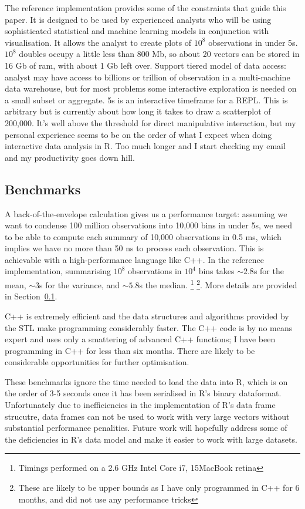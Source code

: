 \documentclass[journal]{vgtc}                %
\begin{document}
The reference implementation provides some of the constraints that guide this paper. It is designed to be used by experienced analysts who will be using  sophisticated statistical and machine learning models in conjunction with visualisation.  It allows the analyst to create plots of $10^8$ observations in under 5s. $10^8$ doubles occupy a little less than 800 Mb, so about 20 vectors can be stored in 16 Gb of ram, with about 1 Gb left over. Support tiered model of data access: analyst may have access to billions or trillion of observation in a multi-machine data warehouse, but for most problems some interactive exploration is needed on a small subset or aggregate. 5s is an interactive timeframe for a REPL.  This is arbitrary but is currently about how long it takes to draw a scatterplot of 200,000. It's well above the threshold for direct manipulative interaction, but my personal experience seems to be on the order of what I expect when doing interactive data analysis in R.  Too much longer and I start checking my email and my productivity goes down hill.

\subsection{Benchmarks}
\label{sub:benchmarks}

A back-of-the-envelope calculation gives us a performance target: assuming we want to condense 100 million observations into 10,000 bins in under 5s, we need to be able to compute each summary of 10,000 observations in 0.5 ms, which implies we have no more than 50 ns to process each observation. This is achievable with a high-performance language like C++. In the reference implementation, summarising $10^8$ observations in $10^4$ bins takes $\sim 2.8$s for the mean, $\sim 3$s for the variance, and $\sim 5.8$s the median. \footnote{Timings performed on a 2.6 GHz Intel Core i7, 15\" MacBook retina} \footnote{These are likely to be upper bounds as I have only programmed in C++ for 6 months, and did not use any performance tricks}.  More details are provided in Section~\ref{sub:benchmarks}.


C++ is extremely efficient and the data structures and algorithms provided by the STL make programming considerably faster.  The C++ code is by no means expert and uses only a smattering of advanced C++ functions; I have been programming in C++ for less than six months. There are likely to be considerable opportunities for further optimisation.

These benchmarks ignore the time needed to load the data into R, which is on the order of 3-5 seconds once it has been serialised in R's binary dataformat.  Unfortunately due to inefficiencies in the implementation of R's data frame strucutre, data frames can not be used to work with very large vectors without substantial performance penalities. Future work will hopefully address some of the deficiencies in R's data model and make it easier to work with large datasets.
\end{document}
